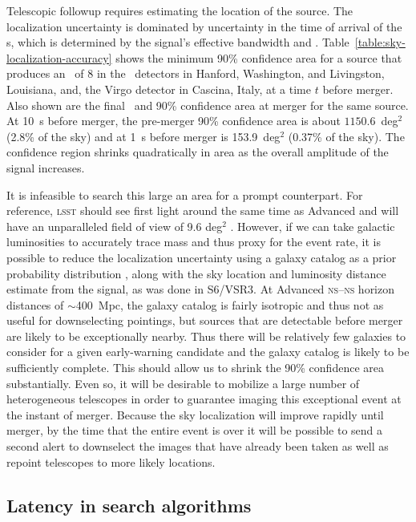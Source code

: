 Telescopic followup requires estimating the location of the \GW{} source. The
localization uncertainty is dominated by uncertainty in the time of arrival of
the \GW{}s, which is determined by the signal's effective bandwidth and \SNR{}
\citep{Fairhurst2009}.  Table~\ref{table:sky-localization-accuracy} shows the
minimum 90\% confidence area for a source that produces an \SNR\ of 8 in the
\LIGO\ detectors in Hanford, Washington, and Livingston, Louisiana, and, the
Virgo detector in Cascina, Italy, at a time $t$ before merger.  Also shown are
the final \SNR\ and 90\% confidence area at merger for the same source.
At 10~s before merger, the pre-merger 90\% confidence area is about $1150.6$~deg$^2$
(2.8\% of the sky) and at 1~s before merger is 153.9~deg$^2$ (0.37\% of the sky).
The confidence region shrinks quadratically in area as the overall amplitude of the
signal increases.

It is infeasible to search this large an area for a prompt counterpart. For
reference, \textsc{lsst} should see first light around the same time as
Advanced \LIGO{} and will have an unparalleled field of view of 9.6 deg$^2$
\citep{2008arXiv0805.2366I}.  However, if we can take galactic luminosities
to accurately trace mass and thus proxy
for the \CBC{} event rate, it is possible to reduce the localization
uncertainty using a galaxy catalog as a prior probability distribution
\citep{galaxy-catalog}, along with the sky location and luminosity distance
estimate from the \GW{} signal, as was done in S6/VSR3. At Advanced \LIGO{}
\textsc{ns}--\textsc{ns} horizon distances of $\sim$400~Mpc, the galaxy catalog
is fairly isotropic and thus not as useful for downselecting pointings, but
sources that are detectable before merger are likely to be exceptionally
nearby. Thus there will be relatively few galaxies to consider for a given
early-warning candidate and the galaxy catalog is likely to be sufficiently
complete. This should allow us to shrink the 90\% confidence area substantially.
Even so, it will be desirable to mobilize a large number of heterogeneous
telescopes in order to guarantee imaging this exceptional event at the instant
of merger. Because the sky localization will improve rapidly until merger,
by the time that the entire \CBC{} event is over it will be
possible to send a second alert to downselect the images that have already been
taken as well as repoint telescopes to more likely locations.

\subsection{Latency in \CBC{} search algorithms}

